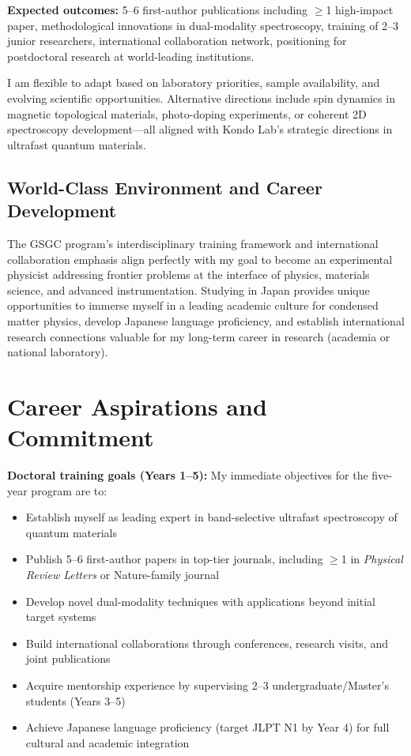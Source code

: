 \documentclass[11pt,a4paper]{article}
\begin{document}
\textbf{Expected outcomes:} 5--6 first-author publications including $\geq$1 high-impact paper, methodological innovations in dual-modality spectroscopy, training of 2--3 junior researchers, international collaboration network, positioning for postdoctoral research at world-leading institutions.

I am flexible to adapt based on laboratory priorities, sample availability, and evolving scientific opportunities. Alternative directions include spin dynamics in magnetic topological materials, photo-doping experiments, or coherent 2D spectroscopy development—all aligned with Kondo Lab's strategic directions in ultrafast quantum materials.

\subsection{World-Class Environment and Career Development}

The GSGC program's interdisciplinary training framework and international collaboration emphasis align perfectly with my goal to become an experimental physicist addressing frontier problems at the interface of physics, materials science, and advanced instrumentation. Studying in Japan provides unique opportunities to immerse myself in a leading academic culture for condensed matter physics, develop Japanese language proficiency, and establish international research connections valuable for my long-term career in research (academia or national laboratory).

\section{Career Aspirations and Commitment}

\textbf{Doctoral training goals (Years 1--5):} My immediate objectives for the five-year program are to:
\begin{itemize}
    \item Establish myself as leading expert in band-selective ultrafast spectroscopy of quantum materials
    \item Publish 5--6 first-author papers in top-tier journals, including $\geq$1 in \textit{Physical Review Letters} or Nature-family journal
    \item Develop novel dual-modality techniques with applications beyond initial target systems
    \item Build international collaborations through conferences, research visits, and joint publications
    \item Acquire mentorship experience by supervising 2--3 undergraduate/Master's students (Years 3--5)
    \item Achieve Japanese language proficiency (target JLPT N1 by Year 4) for full cultural and academic integration
\end{itemize}
\end{document}
